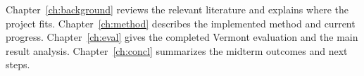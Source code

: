 Chapter~\ref{ch:background} reviews the relevant literature and explains where
the project fits. Chapter~\ref{ch:method} describes the implemented method and
current progress. Chapter~\ref{ch:eval} gives the completed Vermont evaluation
and the main result analysis. Chapter~\ref{ch:concl} summarizes the midterm
outcomes and next steps.
